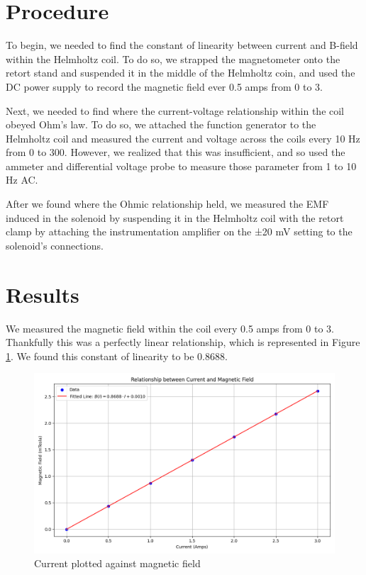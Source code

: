 \documentclass[12pt,letterpaper]{article}
\begin{document}
\section{Procedure}

To begin, we needed to find the constant of linearity between current and B-field within the Helmholtz coil. To do so, we strapped the magnetometer onto the retort stand and suspended it in the middle of the Helmholtz coin, and used the DC power supply to record the magnetic field ever 0.5 amps from 0 to 3. 

Next, we needed to find where the current-voltage relationship within the coil obeyed Ohm's law. To do so, we attached the function generator to the Helmholtz coil and measured the current and voltage across the coils every 10 Hz from 0 to 300. However, we realized that this was insufficient, and so used the ammeter and differential voltage probe to measure those parameter from 1 to 10 Hz AC.

After we found where the Ohmic relationship held, we measured the EMF induced in the solenoid by suspending it in the Helmholtz coil with the retort clamp by attaching the instrumentation amplifier on the ±20 mV setting to the solenoid's connections.

\section{Results}

We measured the magnetic field within the coil every 0.5 amps from 0 to 3. Thankfully this was a perfectly linear relationship, which is represented in Figure \ref{fig:field}. We found this constant of linearity to be 0.8688.

\begin{figure}[ht]
    \centering
    \includegraphics[width=5in]{images/Current_vs_Magnetic_Field.png}
    \caption{Current plotted against magnetic field}
    \label{fig:field}
\end{figure}
\end{document}
